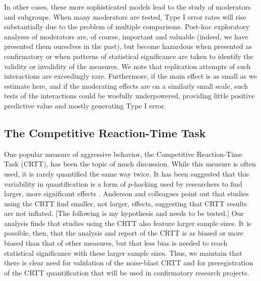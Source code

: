 \documentclass[man]{apa6}
\begin{document}
In other cases, these more sophisticated models lead to the study of moderators and subgroups. When many moderators are tested, Type I error rates will rise substantially due to the problem of multiple comparisons. Post-hoc exploratory analyses of moderators are, of course, important and valuable (indeed, we have presented them ourselves in the past), but become hazardous when presented as confirmatory or when patterns of statistical significance are taken to identify the validity or invalidity of the measures. We note that replication attempts of such interactions are exceedingly rare. Furthermore, if the main effect is as small as we estimate here, and if the moderating effects are on a similarly small scale, such tests of the interactions could be woefully underpowered, providing little positive predictive value and mostly generating Type I error.

\subsection{The Competitive Reaction-Time Task}
One popular measure of aggressive behavior, the Competitive Reaction-Time Task (CRTT), has been the topic of much discussion. While this measure is often used, it is rarely quantified the same way twice. It has been suggested that this variability in quantification is a form of $p$-hacking used by researchers to find larger, more significant effects \citep{Elson:etal:2014}. Anderson and colleagues point out that studies using the CRTT find smaller, not larger, effects, suggesting that CRTT results are not inflated.
[The following is my hypothesis and needs to be tested.] Our analysis finds that studies using the CRTT also feature larger sample sizes. It is possible, then, that the analysis and report of the CRTT is as biased or more biased than that of other measures, but that less bias is needed to reach statistical significance with these larger sample sizes. Thus, we maintain that there is clear need for validation of the noise-blast CRTT and for preregistration of the CRTT quantification that will be used in confirmatory research projects.

\end{document}
